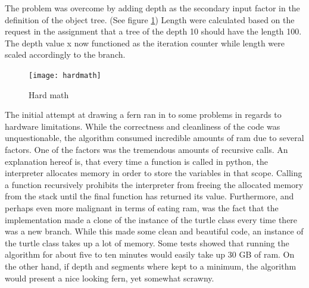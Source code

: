 \documentclass[titlepage]{article}
\begin{document}
The problem was overcome by adding depth as the secondary input factor in the definition of the object tree. (See figure \ref{fig:hardmath})  Length were calculated based on the request in the assignment that a tree of the depth 10 should have the length 100. The depth value x now functioned as the iteration counter while length were scaled accordingly to the branch.\par
\begin{figure}[H]
  \centering
  \texttt{[image: hardmath]}
  \caption{Hard math}
  \label{fig:hardmath}
\end{figure}

The initial attempt at drawing a fern ran in to some problems in regards to hardware limitations. While the correctness and cleanliness of the code was unquestionable, the algorithm consumed incredible amounts of ram due to several factors. One of the factors was the tremendous amounts of recursive calls. An explanation hereof is, that every time a function is called in python, the interpreter allocates memory in order to store the variables in that scope. Calling a function recursively prohibits the interpreter from freeing the allocated memory from the stack until the final function has returned its value. Furthermore, and perhaps even more malignant in terms of eating ram, was the fact that the implementation made a clone of the instance of the turtle class every time there was a new branch. While this made some clean and beautiful code, an instance of the turtle class takes up a lot of memory. Some tests showed that running the algorithm for about five to ten minutes would easily take up 30 GB of ram. On the other hand, if depth and segments where kept to a minimum, the algorithm would present a nice looking fern, yet somewhat scrawny.
\end{document}
